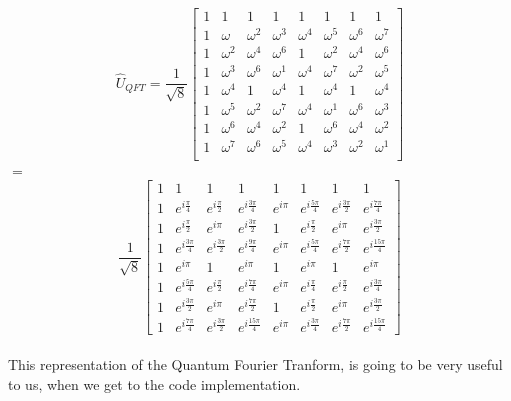 \documentclass[inscr,ack,preface]{diphdthesis}
\begin{document}
\Large

\[
\hat{U}_{QFT}=\frac{1}{\sqrt{8}}
\begin{bmatrix}
1 & 1 & 1 & 1 & 1 & 1 & 1 & 1 \\
1 & \omega & \omega^2 & \omega^3 & \omega^4 & \omega^5 & \omega^6 & \omega^7 \\
1 & \omega^2 & \omega^4 & \omega^6 & 1 & \omega^2 & \omega^4 & \omega^6 \\
1 & \omega^3 & \omega^6 & \omega^1 & \omega^4 & \omega^7 & \omega^2 & \omega^5 \\
1 & \omega^4 & 1 & \omega^4 & 1 & \omega^4 & 1 & \omega^4 \\
1 & \omega^5 & \omega^2 & \omega^7 & \omega^4 & \omega^1 & \omega^6 & \omega^3 \\
1 & \omega^6 & \omega^4 & \omega^2 & 1 & \omega^6 & \omega^4 & \omega^2 \\
1 & \omega^7 & \omega^6 & \omega^5 & \omega^4 & \omega^3 & \omega^2 & \omega^1 \\
\end{bmatrix}
\]
$=$\[
\frac{1}{\sqrt{8}} \begin{bmatrix}
1 & 1 & 1 & 1 & 1 & 1 & 1 & 1 \\
1 & e^{i\frac{\pi}{4}} & e^{i\frac{\pi}{2}} & e^{i\frac{3\pi}{4}} & e^{i\pi} & e^{i\frac{5\pi}{4}} & e^{i\frac{3\pi}{2}} & e^{i\frac{7\pi}{4}} \\
1 & e^{i\frac{\pi}{2}} & e^{i\pi} & e^{i\frac{3\pi}{2}} & 1 & e^{i\frac{\pi}{2}} & e^{i\pi} & e^{i\frac{3\pi}{2}} \\
1 & e^{i\frac{3\pi}{4}} & e^{i\frac{3\pi}{2}} & e^{i\frac{9\pi}{4}} & e^{i\pi} & e^{i\frac{5\pi}{4}} & e^{i\frac{7\pi}{2}} & e^{i\frac{15\pi}{4}} \\
1 & e^{i\pi} & 1 & e^{i\pi} & 1 & e^{i\pi} & 1 & e^{i\pi} \\
1 & e^{i\frac{5\pi}{4}} & e^{i\frac{\pi}{2}} & e^{i\frac{7\pi}{4}} & e^{i\pi} & e^{i\frac{\pi}{4}} & e^{i\frac{\pi}{2}} & e^{i\frac{3\pi}{4}} \\
1 & e^{i\frac{3\pi}{2}} & e^{i\pi} & e^{i\frac{7\pi}{2}} & 1 & e^{i\frac{\pi}{2}} & e^{i\pi} & e^{i\frac{3\pi}{2}} \\
1 & e^{i\frac{7\pi}{4}} & e^{i\frac{3\pi}{2}} & e^{i\frac{15\pi}{4}} & e^{i\pi} & e^{i\frac{3\pi}{4}} & e^{i\frac{7\pi}{2}} & e^{i\frac{15\pi}{4}}
\end{bmatrix}
\]
\normalsize 
\\This representation of the Quantum Fourier Tranform, is going to be very useful to us, when we get to the code implementation.
\end{document}
